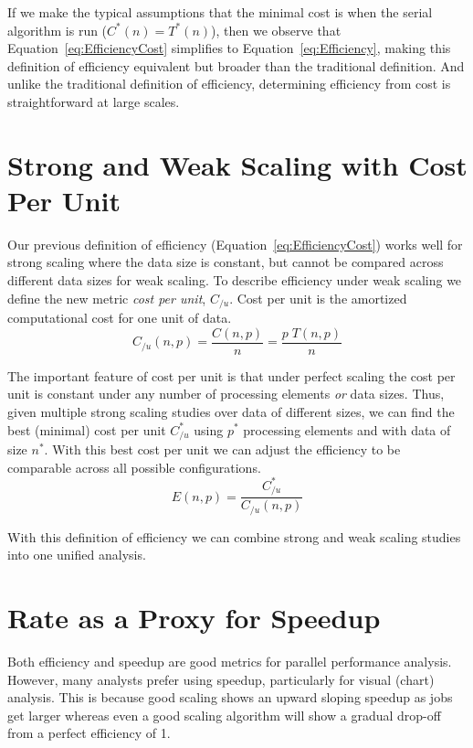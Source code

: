 \documentclass{llncs}
\newcommand*{\keyterm}[1]{\emph{#1}}
\begin{document}
If we make the typical assumptions that the minimal cost is when the serial
algorithm is run ($C^*(n) = T^*(n)$), then we observe that
Equation~\ref{eq:EfficiencyCost} simplifies to
Equation~\ref{eq:Efficiency}, making this definition of efficiency
equivalent but broader than the traditional definition. And unlike the
traditional definition of efficiency, determining efficiency from cost is
straightforward at large scales.


\section{Strong and Weak Scaling with Cost Per Unit}
\label{sec:CostPerUnit}

\noindent
Our previous definition of efficiency (Equation~\ref{eq:EfficiencyCost})
works well for strong scaling where the data size is constant, but cannot
be compared across different data sizes for weak scaling. To describe
efficiency under weak scaling we define the new metric \keyterm{cost per
  unit}, $C_{/u}$. Cost per unit is the amortized computational cost for
one unit of data.
\begin{equation}
  C_{/u}(n,p) = \frac{C(n,p)}{n} = \frac{p \; T(n,p)}{n}
  \label{eq:CostPerUnit}
\end{equation}

The important feature of cost per unit is that under perfect scaling the
cost per unit is constant under any number of processing elements \emph{or}
data sizes. Thus, given multiple strong scaling studies over data of
different sizes, we can find the best (minimal) cost per unit $C_{/u}^*$
using $p^*$ processing elements and with data of size $n^*$. With this best
cost per unit we can adjust the efficiency to be comparable across all
possible configurations.
\begin{equation}
  E(n,p) = \frac{C_{/u}^*}{C_{/u}(n,p)}
  \label{eq:EfficiencyCostPerUnit}
\end{equation}

With this definition of efficiency we can combine strong and weak scaling
studies into one unified analysis.

\section{Rate as a Proxy for Speedup}
\label{sec:RateProxy}

\noindent
Both efficiency and speedup are good metrics for parallel performance
analysis. However, many analysts prefer using speedup, particularly for
visual (chart) analysis. This is because good scaling shows an upward
sloping speedup as jobs get larger whereas even a good scaling algorithm
will show a gradual drop-off from a perfect efficiency of 1.
\end{document}
